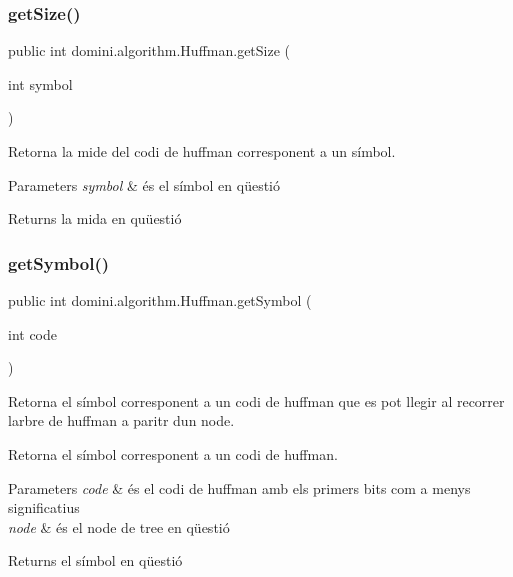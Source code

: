 \subsubsection{\texorpdfstring{get\+Size()}{getSize()}}
{\footnotesize\ttfamily public int domini.\+algorithm.\+Huffman.\+get\+Size (\begin{DoxyParamCaption}\item[{int}]{symbol }\end{DoxyParamCaption})\hspace{0.3cm}{\ttfamily [inline]}}



Retorna la mide del codi de huffman corresponent a un símbol. 


\begin{DoxyParams}{Parameters}
{\em symbol} & és el símbol en qüestió \\
\hline
\end{DoxyParams}
\begin{DoxyReturn}{Returns}
la mida en quüestió 
\end{DoxyReturn}
\mbox{\label{classdomini_1_1algorithm_1_1Huffman_a426cb1d15e2fe89a55e5b0f25e887342}} 
\subsubsection{\texorpdfstring{get\+Symbol()}{getSymbol()}}
{\footnotesize\ttfamily public int domini.\+algorithm.\+Huffman.\+get\+Symbol (\begin{DoxyParamCaption}\item[{int}]{code }\end{DoxyParamCaption})\hspace{0.3cm}{\ttfamily [inline]}}



Retorna el símbol corresponent a un codi de huffman que es pot llegir al recorrer l\textquotesingle{}arbre de huffman a paritr d\textquotesingle{}un node. 

Retorna el símbol corresponent a un codi de huffman.


\begin{DoxyParams}{Parameters}
{\em code} & és el codi de huffman amb els primers bits com a menys significatius \\
\hline
{\em node} & és el node de tree en qüestió \\
\hline
\end{DoxyParams}
\begin{DoxyReturn}{Returns}
el símbol en qüestió
\end{DoxyReturn}

